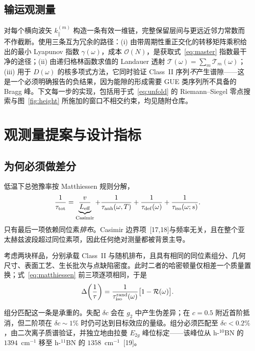 \documentclass[10pt,twocolumn]{article}
\newcommand{\tenB}{$^{10}$B}
\newcommand{\elevenB}{$^{11}$B}
\newcommand{\Tr}{\mathcal{T}}
\begin{document}
\subsection{输运观测量}

对每个横向波矢 $k_\parallel^{(m)}$ 构造一条有效一维链，完整保留层间与更远近邻力常数而不作截断。使用三条互为冗余的路径：(i) 由带周期性重正交化的转移矩阵乘积给出的最小 Lyapunov 指数 $\gamma(\omega)$，成本 $\mathcal{O}(N)$，是获取式~\eqref{eq:master} 指数最干净的途径；(ii) 由递归格林函数求值的 Landauer 透射 $\Tr(\omega)=\sum_m\Tr_m(\omega)$；(iii) 用于 $D(\omega)$ 的核多项式方法，它同时验证 Class~II 序列\emph{不}产生谱隙——这是一个必须明确报告的负结果，因为能隙的形成需要 GUE 类序列所不具备的 Bragg 峰。下文每一步的实现，包括用于式~\eqref{eq:unfold} 的 Riemann--Siegel 零点搜索与图~\ref{fig:height} 所施加的窗口不相交约束，均见随附仓库。

\section{观测量提案与设计指标}
\label{sec:observable}

\subsection{为何必须做差分}

低温下总弛豫率按 Matthiessen 规则分解，
\begin{equation}
  \frac{1}{\tau_{\rm tot}}
    = \underbrace{\frac{v}{L_{\rm eff}}}_{\rm Casimir}
    + \frac{1}{\tau_{\rm anh}(\omega,T)}
    + \frac{1}{\tau_{\rm def}(\omega)}
    + \frac{1}{\tau_{\rm iso}(\omega;s)} .
  \label{eq:matthiessen}
\end{equation}
只有最后一项依赖同位素\emph{排布}。Casimir 边界项~[17,18]与频率无关，且在整个亚太赫兹波段超过同位素项，因此任何绝对测量都被背景主导。

考虑两块样品，分别承载 Class~II 与随机排布，且具有相同的同位素组分、几何尺寸、表面工艺、生长批次与点缺陷密度。此时二者的哈密顿量仅相差一个质量置换；式~\eqref{eq:matthiessen} 前三项逐项相同，于是
\begin{equation}
  \Delta\!\left(\frac{1}{\tau}\right)
    = \frac{1}{\tau_{\rm iso}^{\rm rand}(\omega)}\big[1-\mathcal{R}(\omega)\big].
  \label{eq:diffrate}
\end{equation}

组分匹配这一条是承重的。失配 $\delta c$ 会在 $g_2$ 中产生伪差异；在 $c=0.5$ 附近首阶抵消，但二阶项在 $\delta c\sim1\%$ 时仍可达到目标效应的量级。组分必须匹配至 $\delta c<0.2\%$，由二次离子质谱验证，并独立地由拉曼 $E_{2g}$ 峰位标定——该峰位从 h-\tenB N 的 $1394$~cm$^{-1}$ 移至 h-\elevenB N 的 $1358$~cm$^{-1}$~[19]。
\end{document}
